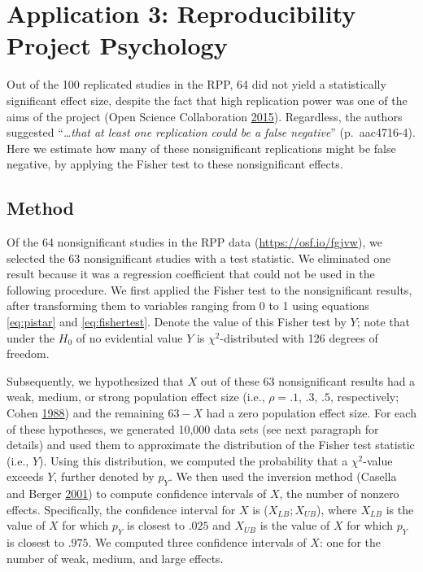 \documentclass[a5paper]{book}
\begin{document}
\section{Application 3: Reproducibility Project
Psychology}\label{application-3-reproducibility-project-psychology}

Out of the 100 replicated studies in the RPP, 64 did not yield a
statistically significant effect size, despite the fact that high
replication power was one of the aims of the project (Open Science
Collaboration
\protect\hyperlink{ref-doi:10.1126ux2fscience.aac4716}{2015}).
Regardless, the authors suggested \enquote{\emph{\ldots{}that at least
one replication could be a false negative}} (p.~aac4716-4). Here we
estimate how many of these nonsignificant replications might be false
negative, by applying the Fisher test to these nonsignificant effects.

\subsection{Method}\label{method-2}

Of the 64 nonsignificant studies in the RPP data
(\url{https://osf.io/fgjvw}), we selected the 63 nonsignificant studies
with a test statistic. We eliminated one result because it was a
regression coefficient that could not be used in the following
procedure. We first applied the Fisher test to the nonsignificant
results, after transforming them to variables ranging from 0 to 1 using
equations \eqref{eq:pistar} and \eqref{eq:fishertest}. Denote the value of
this Fisher test by \(Y\); note that under the \(H_0\) of no evidential
value \(Y\) is \(\chi^2\)-distributed with 126 degrees of freedom.

Subsequently, we hypothesized that \(X\) out of these 63 nonsignificant
results had a weak, medium, or strong population effect size (i.e.,
\(\rho=.1\), \(.3\), \(.5\), respectively; Cohen
\protect\hyperlink{ref-isbn:9780805802832}{1988}) and the remaining
\(63-X\) had a zero population effect size. For each of these
hypotheses, we generated 10,000 data sets (see next paragraph for
details) and used them to approximate the distribution of the Fisher
test statistic (i.e., \(Y\)). Using this distribution, we computed the
probability that a \(\chi^2\)-value exceeds \(Y\), further denoted by
\(p_Y\). We then used the inversion method (Casella and Berger
\protect\hyperlink{ref-isbn:9780534243128}{2001}) to compute confidence
intervals of \(X\), the number of nonzero effects. Specifically, the
confidence interval for \(X\) is (\(X_{LB};X_{UB}\)), where \(X_{LB}\)
is the value of \(X\) for which \(p_Y\) is closest to \(.025\) and
\(X_{UB}\) is the value of \(X\) for which \(p_Y\) is closest to
\(.975\). We computed three confidence intervals of \(X\): one for the
number of weak, medium, and large effects.
\end{document}
